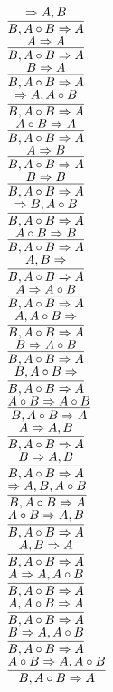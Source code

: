 \documentclass[11pt]{article}
\begin{document}
\begin{center}
\bigskip
\\$\infer{B, A\circ B\Rightarrow A}{\Rightarrow A, B}$
\bigskip
\\$\infer{B, A\circ B\Rightarrow A}{A\Rightarrow A}$
\bigskip
\\$\infer{B, A\circ B\Rightarrow A}{B\Rightarrow A}$
\bigskip
\\$\infer{B, A\circ B\Rightarrow A}{\Rightarrow A, A\circ B}$
\bigskip
\\$\infer{B, A\circ B\Rightarrow A}{A\circ B\Rightarrow A}$
\bigskip
\\$\infer{B, A\circ B\Rightarrow A}{A\Rightarrow B}$
\bigskip
\\$\infer{B, A\circ B\Rightarrow A}{B\Rightarrow B}$
\bigskip
\\$\infer{B, A\circ B\Rightarrow A}{\Rightarrow B, A\circ B}$
\bigskip
\\$\infer{B, A\circ B\Rightarrow A}{A\circ B\Rightarrow B}$
\bigskip
\\$\infer{B, A\circ B\Rightarrow A}{A, B\Rightarrow }$
\bigskip
\\$\infer{B, A\circ B\Rightarrow A}{A\Rightarrow A\circ B}$
\bigskip
\\$\infer{B, A\circ B\Rightarrow A}{A, A\circ B\Rightarrow }$
\bigskip
\\$\infer{B, A\circ B\Rightarrow A}{B\Rightarrow A\circ B}$
\bigskip
\\$\infer{B, A\circ B\Rightarrow A}{B, A\circ B\Rightarrow }$
\bigskip
\\$\infer{B, A\circ B\Rightarrow A}{A\circ B\Rightarrow A\circ B}$
\bigskip
\\$\infer{B, A\circ B\Rightarrow A}{A\Rightarrow A, B}$
\bigskip
\\$\infer{B, A\circ B\Rightarrow A}{B\Rightarrow A, B}$
\bigskip
\\$\infer{B, A\circ B\Rightarrow A}{\Rightarrow A, B, A\circ B}$
\bigskip
\\$\infer{B, A\circ B\Rightarrow A}{A\circ B\Rightarrow A, B}$
\bigskip
\\$\infer{B, A\circ B\Rightarrow A}{A, B\Rightarrow A}$
\bigskip
\\$\infer{B, A\circ B\Rightarrow A}{A\Rightarrow A, A\circ B}$
\bigskip
\\$\infer{B, A\circ B\Rightarrow A}{A, A\circ B\Rightarrow A}$
\bigskip
\\$\infer{B, A\circ B\Rightarrow A}{B\Rightarrow A, A\circ B}$
\bigskip
\\$\infer{B, A\circ B\Rightarrow A}{A\circ B\Rightarrow A, A\circ B}$

\end{center}
\end{document}
